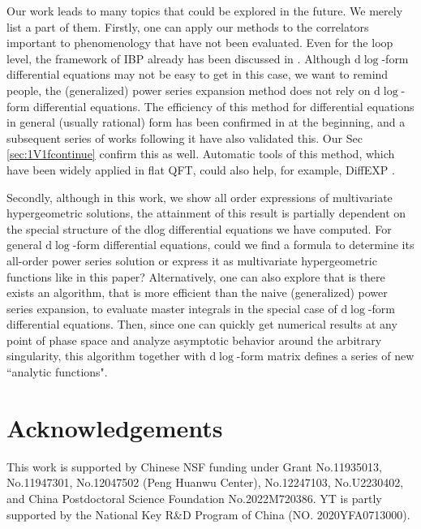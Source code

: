 \documentclass[a4paper,11pt]{article}
\newcommand{\nd}{\mathrm{d}}
\begin{document}
 Our work leads to many topics that could be explored in the future. We merely list a part of them. Firstly, one can apply our methods to the correlators important to phenomenology that have not been evaluated. Even for the loop level, the framework of IBP already has been discussed in \cite{Chen:2023iix}. Although $\nd \log$-form differential equations may not be easy to get in this case,  we want to remind people, the (generalized) power series expansion method does not rely on $\nd \log$-form differential equations. 
The efficiency of this method for differential equations in general (usually rational) form has been confirmed in \cite{Moriello:2019yhu} at the beginning, and a subsequent series of works following it have also validated this. 
Our Sec \ref{sec:1V1fcontinue} confirm this as well. Automatic tools of this method, which have been widely applied in flat QFT, could also help,  for example, DiffEXP \cite{Hidding:2020ytt}.


Secondly, although in this work, we show all order expressions of multivariate hypergeometric solutions, the attainment of this result is partially dependent on the special structure of the dlog differential equations we have computed. For general $\nd \log$-form differential equations, could we find a formula to determine its all-order power series solution or express it as multivariate hypergeometric functions like in this paper? Alternatively, one can also explore that is there exists an algorithm, that is more efficient than the naive (generalized) power series expansion, to evaluate master integrals in the special case of $\nd \log$-form differential equations. Then, since one can quickly get numerical results at any point of phase space and analyze asymptotic behavior around the arbitrary singularity, this algorithm together with $\nd \log$-form matrix defines a series of new ``analytic functions".









\section*{Acknowledgements}
This work is supported by Chinese NSF funding under Grant No.11935013, No.11947301, No.12047502 (Peng Huanwu Center), No.12247103, No.U2230402, and China Postdoctoral Science Foundation No.2022M720386. YT is partly supported by the National Key R\&D Program of China (NO. 2020YFA0713000).
\end{document}
